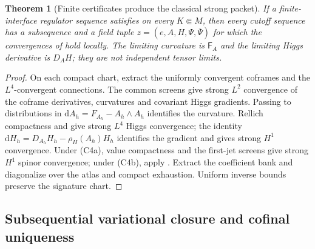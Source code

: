 \documentclass[11pt]{article}
\numberwithin{equation}{section}
\newtheorem{theorem}{Theorem}[section]
\theoremstyle{definition}
\theoremstyle{remark}
\newcommand{\dd}{\mathrm d}
\newcommand{\Fcurv}{\mathsf F}
\newcommand{\bPsi}{\overline\Psi}
\begin{document}
\begin{theorem}[Finite certificates produce the classical strong packet]
\label{thm:certificate-packet}
If a finite-interface regulator sequence satisfies  on every $K\Subset M$, then every cutoff sequence has a subsequence and a field tuple $z=(e,A,H,\Psi,\bPsi)$ for which the convergences of  hold locally.  The limiting curvature is $\Fcurv_A$ and the limiting Higgs derivative is $D_AH$; they are not independent tensor limits.
\end{theorem}
\begin{proof}
On each compact chart, extract the uniformly convergent coframes and the
$L^4$-convergent connections. The common screens give strong $L^2$
convergence of the coframe derivatives, curvatures and covariant Higgs
gradients. Passing to distributions in $\dd A_h=F_{A_h}-A_h\wedge A_h$
identifies the curvature. Rellich compactness and  give
strong $L^4$ Higgs convergence; the identity
$\dd H_h=D_{A_h}H_h-\rho_H(A_h)H_h$ identifies the gradient and gives
strong $H^1$ convergence. Under \textup{(C4a)}, value compactness and the
first-jet screens give strong $H^1$ spinor convergence; under
\textup{(C4b)}, apply . Extract the coefficient
bank and diagonalize over the atlas and compact exhaustion. Uniform inverse
bounds preserve the signature chart.
\end{proof}

\subsection{Subsequential variational closure and cofinal uniqueness}
\end{document}
